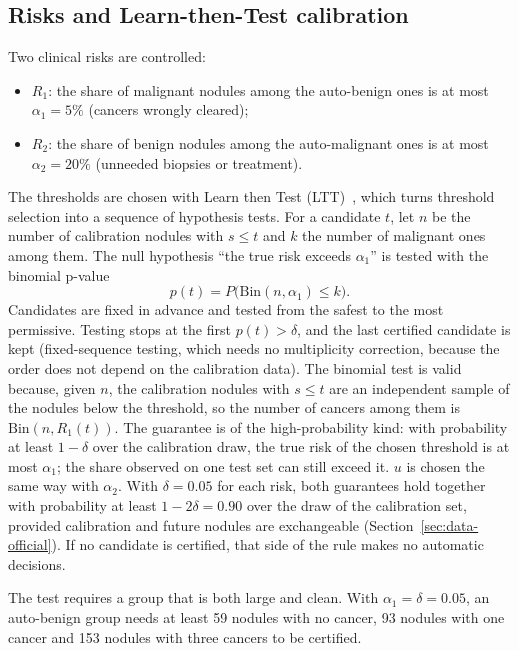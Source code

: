 \subsection{Risks and Learn-then-Test calibration}

Two clinical risks are controlled:

\begin{itemize}
  \item $R_1$: the share of malignant nodules among the auto-benign ones is at most
        $\alpha_1 = 5\%$ (cancers wrongly cleared);
  \item $R_2$: the share of benign nodules among the auto-malignant ones is at most
        $\alpha_2 = 20\%$ (unneeded biopsies or treatment).
\end{itemize}

The thresholds are chosen with Learn then Test (LTT)~\citep{angelopoulos2021ltt}, which turns
threshold selection into a sequence of hypothesis tests. For a candidate $t$, let $n$ be the
number of calibration nodules with $s \le t$ and $k$ the number of malignant ones among them. The
null hypothesis ``the true risk exceeds $\alpha_1$'' is tested with the binomial p-value
\[
  p(t) = P\big(\mathrm{Bin}(n, \alpha_1) \le k\big).
\]
Candidates are fixed in advance and tested from the safest to the most permissive. Testing stops
at the first $p(t) > \delta$, and the last certified candidate is kept (fixed-sequence testing,
which needs no multiplicity correction, because the order does not depend on the calibration
data). The binomial test is valid because, given $n$, the calibration nodules with $s \le t$ are
an independent sample of the nodules below the threshold, so the number of cancers among them is
$\mathrm{Bin}(n, R_1(t))$. The guarantee is of the high-probability kind: with probability at least
$1 - \delta$ over the calibration draw, the true risk of the chosen threshold is at most
$\alpha_1$; the share observed on one test set can still exceed it. $u$ is chosen the same way with $\alpha_2$. With
$\delta = 0.05$ for each risk, both guarantees hold together with probability at least
$1 - 2\delta = 0.90$ over the draw of the calibration set, provided calibration and future nodules
are exchangeable (Section~\ref{sec:data-official}). If no candidate is certified, that side of the
rule makes no automatic decisions.

The test requires a group that is both large and clean. With $\alpha_1 = \delta = 0.05$, an
auto-benign group needs at least 59 nodules with no cancer, 93 nodules with one cancer and 153
nodules with three cancers to be certified.

